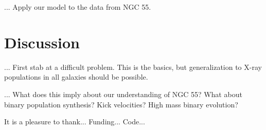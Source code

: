 \documentclass[12pt, preprint]{aastex}
\begin{document}
... Apply our model to the data from NGC 55. 

\section{Discussion}

... First stab at a difficult problem. This is the basics, but generalization to X-ray populations in all galaxies should be possible.

... What does this imply about our understanding of NGC 55? What about binary population synthesis? Kick velocities? High mass binary evolution?

\acknowledgements
It is a pleasure to thank...
Funding...
Code...
\end{document}
